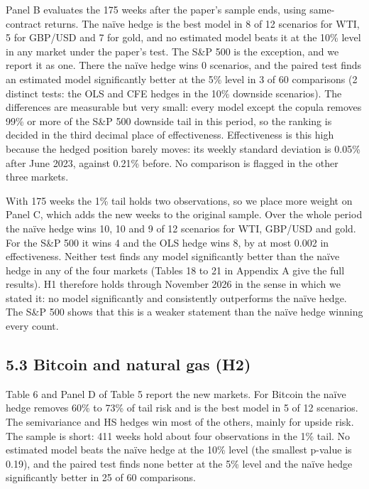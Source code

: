 \documentclass[11pt,letterpaper]{article}
\begin{document}
Panel B evaluates the 175 weeks after the paper's sample ends, using same-contract returns. The naïve hedge is the best model in 8 of 12 scenarios for WTI, 5 for GBP/USD and 7 for gold, and no estimated model beats it at the 10\% level in any market under the paper's test. The S\&P 500 is the exception, and we report it as one. There the naïve hedge wins 0 scenarios, and the paired test finds an estimated model significantly better at the 5\% level in 3 of 60 comparisons (2 distinct tests: the OLS and CFE hedges in the 10\% downside scenarios). The differences are measurable but very small: every model except the copula removes 99\% or more of the S\&P 500 downside tail in this period, so the ranking is decided in the third decimal place of effectiveness. Effectiveness is this high because the hedged position barely moves: its weekly standard deviation is 0.05\% after June 2023, against 0.21\% before. No comparison is flagged in the other three markets.

With 175 weeks the 1\% tail holds two observations, so we place more weight on Panel C, which adds the new weeks to the original sample. Over the whole period the naïve hedge wins 10, 10 and 9 of 12 scenarios for WTI, GBP/USD and gold. For the S\&P 500 it wins 4 and the OLS hedge wins 8, by at most 0.002 in effectiveness. Neither test finds any model significantly better than the naïve hedge in any of the four markets (Tables 18 to 21 in Appendix A give the full results). H1 therefore holds through November 2026 in the sense in which we stated it: no model significantly and consistently outperforms the naïve hedge. The S\&P 500 shows that this is a weaker statement than the naïve hedge winning every count.

\subsection*{5.3 Bitcoin and natural gas (H2)}

Table 6 and Panel D of Table 5 report the new markets. For Bitcoin the naïve hedge removes 60\% to 73\% of tail risk and is the best model in 5 of 12 scenarios. The semivariance and HS hedges win most of the others, mainly for upside risk. The sample is short: 411 weeks hold about four observations in the 1\% tail. No estimated model beats the naïve hedge at the 10\% level (the smallest p-value is 0.19), and the paired test finds none better at the 5\% level and the naïve hedge significantly better in 25 of 60 comparisons.
\end{document}
